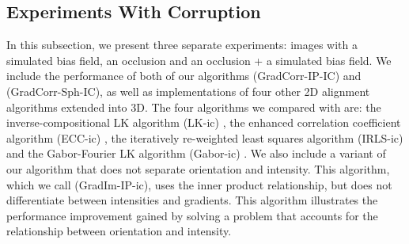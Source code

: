 \subsection{Experiments With Corruption}\label{subsec:results-corrupted}
In this subsection, we present three separate experiments: images with a simulated bias field, an occlusion and an occlusion + a simulated bias field. We include the performance of both of our algorithms (GradCorr-IP-IC) and (GradCorr-Sph-IC), as well as implementations of four other 2D alignment algorithms extended into 3D. The four algorithms we compared with are: the inverse-compositional LK algorithm (LK-ic) \cite{RefWorks:10}, the enhanced correlation coefficient algorithm (ECC-ic) \cite{RefWorks:59}, the iteratively re-weighted least squares algorithm (IRLS-ic) \cite{RefWorks:53} and the Gabor-Fourier LK algorithm (Gabor-ic) \cite{RefWorks:73}. We also include a variant of our algorithm that does not separate orientation and intensity. This algorithm, which we call (GradIm-IP-ic), uses the inner product relationship, but does not differentiate between intensities and gradients. This algorithm illustrates the performance improvement gained by solving a problem that accounts for the relationship between orientation and intensity.

